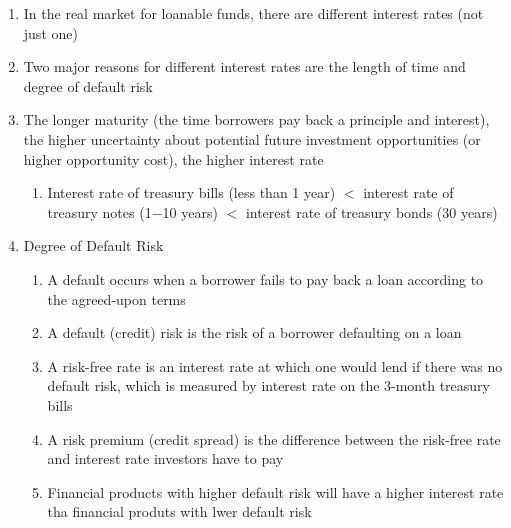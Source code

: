 \documentclass[12pt]{article}
\begin{document}
\begin{enumerate}
        \begin{enumerate}

          \item In the real market for loanable funds, there are different interest rates (not just one)

          \item Two major reasons for different interest rates are the length of time and degree of default risk

          \item The longer maturity (the time borrowers pay back a principle and interest), the higher uncertainty about potential future investment opportunities (or higher opportunity cost), the higher interest rate

            \begin{enumerate}

              \item Interest rate of treasury bills (less than 1 year) $<$ interest rate of treasury notes (1$-$10 years) $<$ interest rate of treasury bonds (30 years)

            \end{enumerate}

          \item Degree of Default Risk

            \begin{enumerate}

              \item A default occurs when a borrower fails to pay back a loan according to the agreed-upon terms

              \item A default (credit) risk is the risk of a borrower defaulting on a loan

              \item A risk-free rate is an interest rate at which one would lend if there was no default risk, which is measured by interest rate on the 3-month treasury bills

              \item A risk premium (credit spread) is the difference between the risk-free rate and interest rate investors have to pay

              \item Financial products with higher default risk will have a higher interest rate tha financial produts with lwer default risk

                \begin{enumerate}


\end{enumerate}
\end{enumerate}
\end{enumerate}
\end{enumerate}
\end{document}
